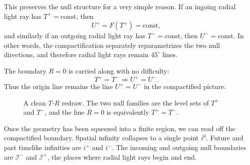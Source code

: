 This preserves the null structure for a very simple reason. If an ingoing radial light ray has \(T^+=\text{const}\), then
\[
U^+=F(T^+)=\text{const},
\]
and similarly if an outgoing radial light ray has \(T^-=\text{const}\), then \(U^-=\text{const}\). In other words, the compactification separately reparametrizes the two null directions, and therefore radial light rays remain \(45^\circ\) lines.

The boundary \(R=0\) is carried along with no difficulty:
\[
T^+=T^- \Longrightarrow U^+=U^-.
\]
Thus the origin line remains the line \(U^+=U^-\) in the compactified picture.

\begin{figure}[htbp]
\centering
{}
\caption{A clean \(T\)-\(R\) redraw. The two null families are the level sets of \(T^+\) and \(T^-\), and the line \(R=0\) is equivalently \(T^+=T^-\).}
\end{figure}

Once the geometry has been squeezed into a finite region, we can read off the compactified boundary. Spatial infinity collapses to a single point \(i^0\). Future and past timelike infinities are \(i^+\) and \(i^-\). The incoming and outgoing null boundaries are \(\mathscr I^-\) and \(\mathscr I^+\), the places where radial light rays begin and end.

